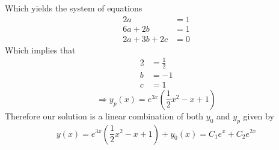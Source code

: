 \documentclass[11pt]{article}
\numberwithin{equation}{section}
\begin{document}
Which yields the system of equations
\begin{align*}
2a &= 1\\
6a + 2b &= 1\\
2a + 3b + 2c &= 0
\end{align*}
Which implies that
\begin{align*}
2 &= \frac{1}{2}\\
b &= -1\\
c &= 1
\end{align*}
$$\Rightarrow y_p(x) = e^{3x}\left(\frac{1}{2}x^2-x+1\right)$$
Therefore our solution is a linear combination of both $y_0$ and $y_p$ given by
$$y(x) = e^{3x}\left(\frac{1}{2}x^2-x+1\right) + y_0(x) = C_1e^{x} + C_2e^{2x}$$
\end{document}
